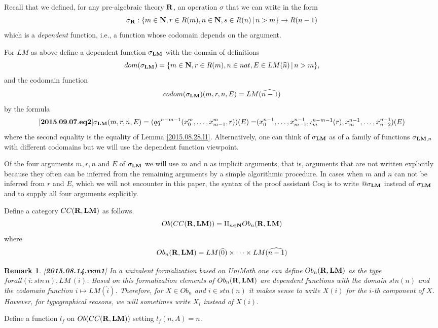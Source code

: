 \documentclass[11pt]{article}
\newenvironment{eq}{\begin{equation}}{\end{equation}}
\newtheorem{remark}[proposition]{Remark}
\newcommand{\llabel}[1]{\label{#1}[{\bf #1}]}
\newcommand{\sr}{\rightarrow}
\newcommand{\nn}{{\bf N\rm}}
\newcommand{\nat}{\nn}
\newcommand{\rr}{{\bf R}}
\newcommand{\lm}{{\bf LM}}
\newcommand{\wh}{\widehat}
\begin{document}
Recall that we defined, for any pre-algebraic theory $\rr$, an operation $\sigma$ that we can write in the form
%
$$\sigma_{\rr}:\{m\in\nat,r\in R(m),n\in\nat,s\in R(n)\,|\,n>m\}\sr R(n-1)$$
%
which is a {\em dependent} function, i.e., a function whose codomain depends on the argument. 

For $LM$ as above define a dependent function $\sigma_{\lm}$ with the domain of definitions 
%
$$dom(\sigma_{\lm})=\{m\in\nat,r\in R(m),n\in nat, E\in LM(\wh{n})\,|\,n>m\},$$
%
and the codomain function
%
$$codom(\sigma_{\lm})(m,r,n,E)=LM(\wh{n-1})$$
%
by the formula
%
\begin{eq}\llabel{2015.09.07.eq2}
\sigma_{\lm}(m,r,n,E)=(qq^{n-m-1}(x_0^m,\dots,x_{m-1}^m,r))(E)=$$
$$(x_0^{n-1},\dots,x_{m-1}^{n-1},\iota_m^{n-m-1}(r),x_m^{n-1},\dots, x_{n-2}^{n-1})(E)
\end{eq}
%
where the second equality is the equality of Lemma \ref{2015.08.28.l1}. Alternatively, one can think of $\sigma_{\lm}$ as of a family of functions $\sigma_{\lm,n}$ with different codomains but we will use the dependent function viewpoint.

Of the four arguments $m,r,n$ and $E$ of $\sigma_{\lm}$ we will use $m$ and $n$ as implicit arguments, that is, arguments that are not written explicitly because they often can be inferred from the remaining arguments by a simple algorithmic procedure. In cases when $m$ and $n$ can not be inferred from $r$ and $E$, which we will not encounter in this paper, the syntax of the proof assistant Coq is to write $@\sigma_{\lm}$ instead of $\sigma_{\lm}$ and to supply all four arguments explicitly. 

Define a category $CC(\rr,\lm)$ as follows.
%
$$Ob(CC(\rr,\lm))=\amalg_{n\in\nat} Ob_n(\rr,\lm)$$
%
where 
%
$$Ob_n(\rr,\lm)=LM(\wh{0})\times\dots\times LM(\wh{n-1})$$
%
\begin{remark}\rm
\llabel{2015.08.14.rem1}
In a univalent formalization based on UniMath one can define $Ob_n(\rr,\lm)$ as the type $forall(i:stn\,n),LM\, (i)$. Based on this formalization elements of $Ob_n(\rr,\lm)$ are dependent functions with the domain $stn(n)$ and the codomain function $i\mapsto LM(\wh{i})$. Therefore, for $X\in Ob_n$ and $i\in stn(n)$ it makes sense to write $X(i)$ for the $i$-th component of $X$. However, for typographical reasons, we will sometimes write $X_i$ instead of $X(i)$. 
\end{remark}
%

Define a function $l_f$ on $Ob(CC(\rr,\lm))$ setting $l_f(n,A)=n$.
\end{document}
